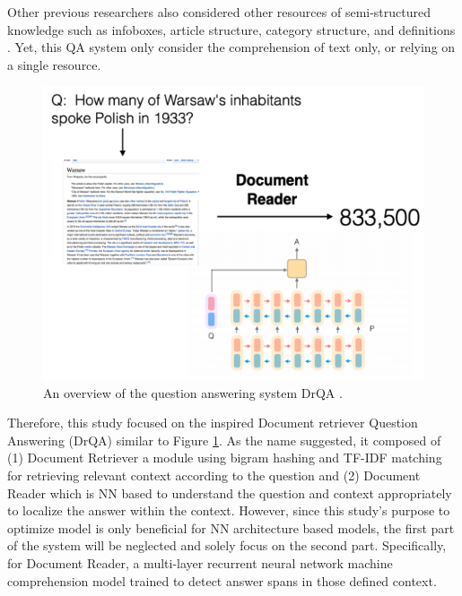 Other previous researchers also considered other resources of semi-structured knowledge such as infoboxes, article structure, category structure, and definitions \cite{Ryu}. Yet, this QA system only consider the comprehension of text only, or relying on a single resource.
    
    \begin{figure}[!t]
    \centering
    \includegraphics[width=\linewidth]{img/QA.png}
    \vspace{10pt}
    \caption{An overview of the question answering system DrQA \cite{DrQA}.}
    \label{fig:DrQA_overview}
\end{figure}






Therefore, this study focused on the inspired Document retriever Question Answering (DrQA) similar to Figure \ref{fig:DrQA_overview}. As the name suggested, it composed of (1) Document Retriever a module using bigram hashing and TF-IDF matching for retrieving relevant context according to the question and (2) Document Reader which is NN based to understand the question and context appropriately to localize the answer within the context. However, since this study's purpose to optimize model is only beneficial for NN architecture based models, the first part of the system will be neglected and solely focus on the second part. Specifically, for Document
Reader, a multi-layer recurrent neural network
machine comprehension model trained to detect
answer spans in those defined context.





